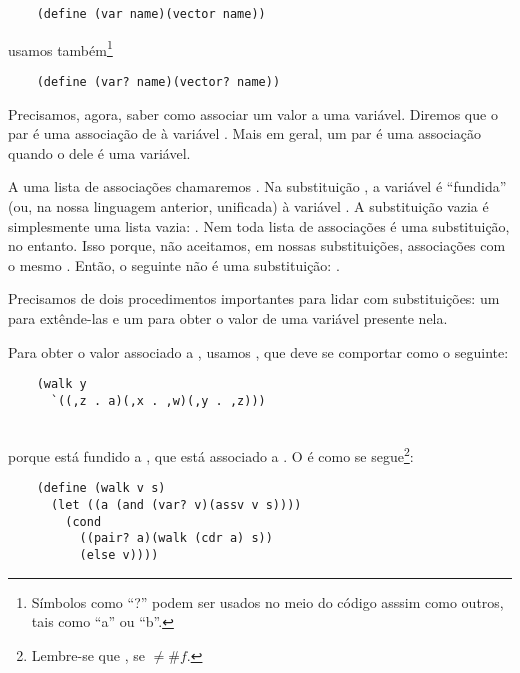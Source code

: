 \documentclass{article}
\begin{document}
  \begin{lstlisting}
    (define (var name)(vector name))
  \end{lstlisting}

  \noindent usamos também\footnote{Símbolos como ``?'' podem ser
    usados no meio do código asssim como outros, tais como ``a'' ou ``b''.}

  \begin{lstlisting}
    (define (var? name)(vector? name))
  \end{lstlisting}

  Precisamos, agora, saber como associar um valor a uma
  variável. Diremos que o par  é uma associação de
   à variável . Mais em geral, um par é uma
  associação quando o  dele é uma variável.

  A uma lista de associações chamaremos . Na
  substituição , a variável  é
  ``fundida'' (ou, na nossa linguagem anterior, unificada) à variável
  . A substituição vazia é simplesmente uma lista vazia:
  . Nem toda lista de associações é uma
  substituição, no entanto. Isso porque, não aceitamos, em nossas
  substituições, associações com o mesmo . Então, o
  seguinte não é uma substituição: .

  Precisamos de dois procedimentos importantes para lidar com
  substituições: um para extênde-las e um para obter o valor de uma
  variável presente nela.

  Para obter o valor associado a , usamos ,
  que deve se comportar como o seguinte:
  \begin{lstlisting}
    (walk y
      `((,z . a)(,x . ,w)(,y . ,z)))
  \end{lstlisting}
  \hspace{1cm} \seta {}\\
  porque  está fundido a , que está associado
  a . O  é como se
  segue\footnote{Lembre-se que  \seta {},
    se  $\neq \#f$.}:

  \begin{lstlisting}
    (define (walk v s)
      (let ((a (and (var? v)(assv v s))))
        (cond
          ((pair? a)(walk (cdr a) s))
          (else v))))
  \end{lstlisting}
\end{document}
